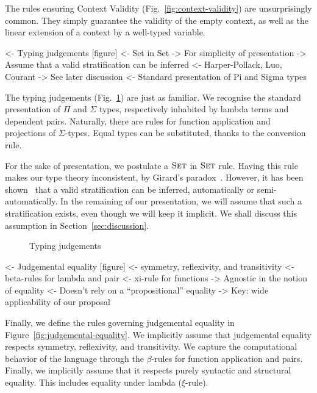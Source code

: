 The rules ensuring Context Validity (Fig.~\ref{fig:context-validity})
are unsurprisingly common. They simply guarantee the validity of the
empty context, as well as the linear extension of a context by a
well-typed variable.

\begin{wstructure}
<- Typing judgements [figure]
    <- Set in Set
        -> For simplicity of presentation
        -> Assume that a valid stratification can be inferred
            <- Harper-Pollack, Luo, Courant
        -> See later discussion
    <- Standard presentation of Pi and Sigma types
\end{wstructure}

The typing judgements (Fig.~\ref{fig:typing-judgements}) are just as
familiar. We recognise the standard presentation of $\Pi$ and $\Sigma$
types, respectively inhabited by lambda terms and dependent
pairs. Naturally, there are rules for function application and
projections of $\Sigma$-types. Equal types can be substituted, thanks
to the conversion rule.

For the sake of presentation, we postulate a $\Set$ in $\Set$
rule. Having this rule makes our type theory inconsistent, by Girard's
paradox~\cite{girard:set-in-set}. However, it has been
shown~\cite{harper:implicit-universe, luo:utt,
  courant:explicit-universe} that a valid stratification can be
inferred, automatically or semi-automatically. In the remaining of our
presentation, we will assume that such a stratification exists, even
though we will keep it implicit. We shall discuss this assumption in
Section~\ref{sec:discussion}.

\begin{figure}



\caption{Typing judgements}
\label{fig:typing-judgements}

\end{figure}


\begin{wstructure}
<- Judgemental equality [figure]
    <- symmetry, reflexivity, and transitivity
    <- beta-rules for lambda and pair
    <- xi-rule for functions
    -> Agnostic in the notion of equality
        <- Doesn't rely on a ``propositional'' equality
        -> Key: wide applicability of our proposal
\end{wstructure}

Finally, we define the rules governing judgemental equality in
Figure~\ref{fig:judgemental-equality}. We implicitly assume that
judgemental equality respects symmetry, reflexivity, and
transitivity. We capture the computational behavior of the language
through the $\beta$-rules for function application and pairs. Finally,
we implicitly assume that it respects purely syntactic and structural
equality. This includes equality under lambda ($\xi$-rule).

